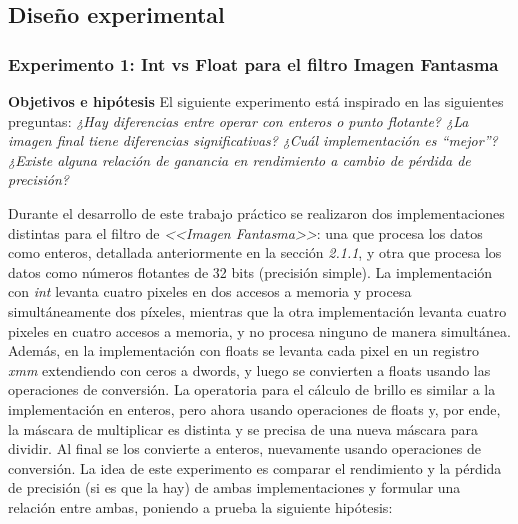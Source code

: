 \documentclass[a4paper]{article}
\begin{document}
     
\subsection{Diseño experimental}

\subsubsection{Experimento 1: Int vs Float para el filtro Imagen Fantasma}

\justify
\textbf{Objetivos e hipótesis}
\justify
El siguiente experimento está inspirado en las siguientes preguntas:
\justify
\textit{¿Hay diferencias entre operar con enteros o punto flotante? ¿La imagen final tiene diferencias significativas?} \textit{¿Cuál implementación es “mejor”?} \textit{¿Existe alguna relación de ganancia en rendimiento a cambio de pérdida de precisión?}

\justify
Durante el desarrollo de este trabajo práctico se realizaron dos implementaciones distintas para el filtro de \textit{<<Imagen Fantasma>>}: una que procesa los datos como enteros, detallada anteriormente en la sección \textit{2.1.1}, y otra que procesa los datos como números flotantes de 32 bits (precisión simple). La implementación con \textit{int} levanta cuatro pixeles en dos accesos a memoria y procesa simultáneamente dos píxeles, mientras que la otra implementación levanta cuatro pixeles en cuatro accesos a memoria, y no procesa ninguno de manera simultánea. Además, en la implementación con floats se levanta cada pixel en un registro \textit{xmm} extendiendo con ceros a dwords, y luego se convierten a floats usando las operaciones de conversión. La operatoria para el cálculo de brillo es similar a la implementación en enteros, pero ahora usando operaciones de floats y, por ende, la máscara de multiplicar es distinta y se precisa de una nueva máscara para dividir. Al final se los convierte a enteros, nuevamente usando operaciones de conversión.
\justify
La idea de este experimento es comparar el rendimiento y la pérdida de precisión (si es que la hay) de ambas implementaciones y formular una relación entre ambas, poniendo a prueba la siguiente hipótesis:
\end{document}
